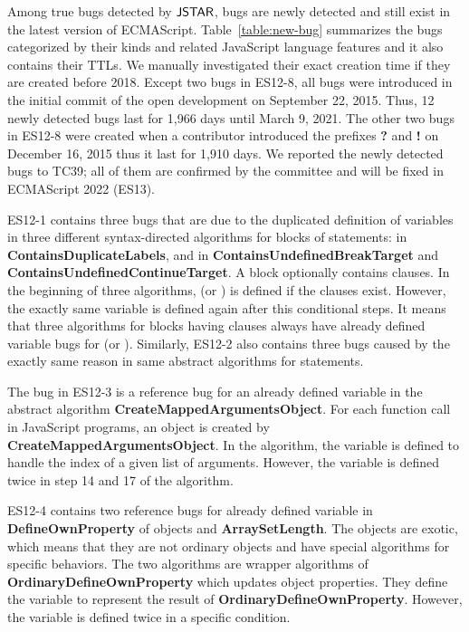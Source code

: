 Among  true bugs detected by $\tool$,  bugs are newly
detected and still exist in the latest version of ECMAScript.
Table~\ref{table:new-bug} summarizes the bugs categorized by their kinds and
related JavaScript language features and it also contains their TTLs. We
manually investigated their exact creation time if they are created before
2018.  Except two bugs in ES12-8, all bugs were introduced in the initial
commit of the open development on September 22, 2015.  Thus, 12 newly detected
bugs last for 1,966 days until March 9, 2021.  The other two bugs in ES12-8 were
created when a contributor introduced the prefixes \textbf{?} and \textbf{!}
on December 16, 2015 thus it last for 1,910 days.  We reported the newly
detected bugs to TC39; all of them are confirmed by the committee and will be
fixed in ECMAScript 2022 (ES13).

ES12-1 contains three bugs that are due to the duplicated definition of
variables in three different syntax-directed algorithms for  blocks
of  statements:  in
\textbf{ContainsDuplicateLabels}, and  in
\textbf{ContainsUndefinedBreakTarget} and
\textbf{ContainsUndefinedContinueTarget}.  A  block optionally
contains  clauses.  In the beginning of three algorithms,
 (or ) is defined if the clauses
exist.  However, the exactly same variable is defined again after this
conditional steps.  It means that three algorithms for  blocks
having  clauses always have already defined variable bugs for
 (or ).  Similarly, ES12-2 also
contains three bugs caused by the exactly same reason in same abstract
algorithms for  statements.

The bug in ES12-3 is a reference bug for an already defined variable
 in the abstract algorithm \textbf{CreateMappedArgumentsObject}.
For each function call in JavaScript programs, an  object is
created by \textbf{CreateMappedArgumentsObject}.  In the algorithm, the variable
 is defined to handle the index of a given list of arguments.
However, the variable is defined twice in step 14 and 17 of the algorithm.

ES12-4 contains two reference bugs for already defined variable 
in \textbf{DefineOwnProperty} of  objects and
\textbf{ArraySetLength}.  The  objects are exotic, which means
that they are not ordinary objects and have special algorithms for specific
behaviors.  The two algorithms are wrapper algorithms of
\textbf{OrdinaryDefineOwnProperty} which updates object properties.  They define
the variable  to represent the result of
\textbf{OrdinaryDefineOwnProperty}.  However, the variable is defined twice in a
specific condition.

